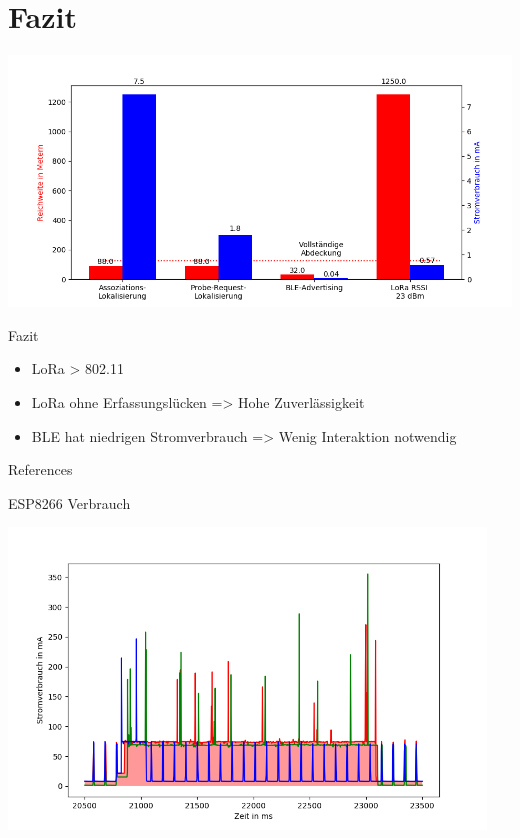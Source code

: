 \documentclass[18pt]{beamer}
\begin{document}
\section{Fazit}
\begin{frame}
	\begin{minipage}[t][0.6\textheight][c]{\textwidth}
		\centering
		\includegraphics[width=\textwidth]{plots/barcomp.png}
	\end{minipage}
	

	\begin{block}{Fazit}
			\begin{itemize}
				\item LoRa > 802.11
				\item LoRa ohne Erfassungslücken => Hohe Zuverlässigkeit
				\item BLE hat niedrigen Stromverbrauch => Wenig Interaktion notwendig
			\end{itemize}
	\end{block}

\end{frame}


\appendix
\beginbackup

\begin{frame}[allowframebreaks]{References}
\printbibliography
\end{frame}

\begin{frame}{ESP8266 Verbrauch}%
	\begin{minipage}[t][\textheight][t]{\textwidth}
		\centering
		\includegraphics[width=0.95\textwidth]{plots/wifillssendv2.png}
	\end{minipage}
\end{frame}
\end{document}
